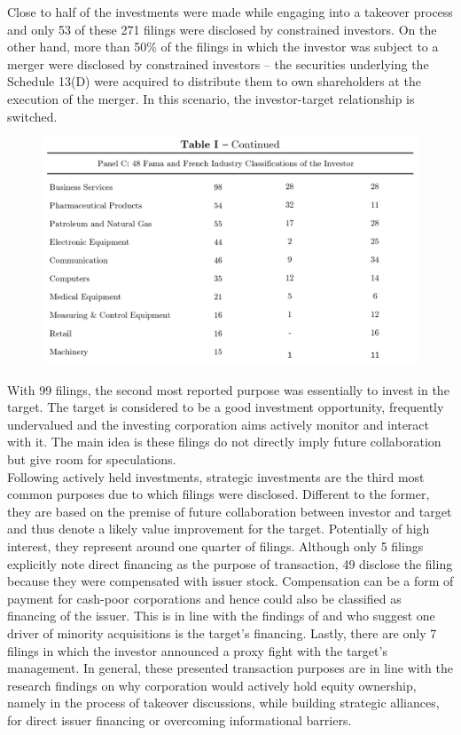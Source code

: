 \documentclass[12pt]{article}
\begin{document}
Close to half of the investments were made while engaging into a takeover process and only 53 of these 271 filings were disclosed by constrained investors. On the other hand, more than 50\% of the filings in which the investor was subject to a merger were disclosed by constrained investors -- the securities underlying the Schedule 13(D) were acquired to distribute them to own shareholders at the execution of the merger. In this scenario, the investor-target relationship is switched.


\begin{figure}[!htb]
	\centering
	\begin{adjustbox}{width=\textwidth}
		\includegraphics{Descriptive}
	\end{adjustbox}
\end{figure}
\noindent With 99 filings, the second most reported purpose was essentially to invest in the target. The target is considered to be a good investment opportunity, frequently undervalued and the investing corporation aims actively monitor and interact with it. The main idea is these filings do not directly imply future collaboration but give room for speculations.\\
Following actively held investments, strategic investments are the third most common purposes due to which filings were disclosed. Different to the former, they are based on the premise of future collaboration between investor and target and thus denote a likely value improvement for the target. Potentially of high interest, they represent around one quarter of filings. Although only 5 filings explicitly note direct financing as the purpose of transaction, 49 disclose the filing because they were compensated with issuer stock. Compensation can be a form of payment for cash-poor corporations and hence could also be classified as financing of the issuer. This is in line with the findings of \citet[p.2792]{Allen2000} and \citet[p.78]{Liao2014} who suggest one driver of minority acquisitions is the target's financing. Lastly, there are only 7 filings in which the investor announced a proxy fight with the target's management. In general, these presented transaction purposes are in line with the research findings on why corporation would actively hold equity ownership, namely in the process of takeover discussions, while building strategic alliances, for direct issuer financing or overcoming informational barriers.\\
\end{document}
